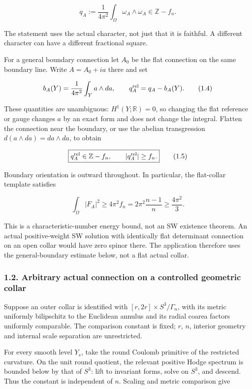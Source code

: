 \documentclass[
  10pt,
]{article}
\begin{document}
\[
 q_A:=\frac1{4\pi^2}\int_\Omega\omega_A\wedge\omega_A
                  \in\mathbb Z-f_n.
 \tag{1.3}
\]

The statement uses the actual character, not just that it is faithful. A
different character can have a different fractional square.

For a general boundary connection let \(A_0\) be the flat connection on
the same boundary line. Write \(A=A_0+ia\) there and set

\[
 b_A(Y)=\frac1{4\pi^2}\int_Y a\wedge da,
 \qquad q_A^{\rm rel}=q_A-b_A(Y).
 \tag{1.4}
\]

These quantities are unambiguous: \(H^1(Y;\mathbb R)=0\), so changing
the flat reference or gauge changes \(a\) by an exact form and does not
change the integral. Flatten the connection near the boundary, or use
the abelian transgression \(d(a\wedge da)=da\wedge da\), to obtain

\[
 \boxed{q_A^{\rm rel}\in\mathbb Z-f_n,\qquad
 |q_A^{\rm rel}|\ge f_n.}
 \tag{1.5}
\]

Boundary orientation is outward throughout. In particular, the
flat-collar template satisfies

\[
 \boxed{\int_\Omega|F_A|^2\ge4\pi^2 f_n
             =2\pi^2\frac{n-1}{n}\ge\frac{4\pi^2}{3}.}
 \tag{1.6}
\]

This is a characteristic-number energy bound, not an SW existence
theorem. An actual positive-weight SW solution with identically flat
determinant connection on an open collar would have zero spinor there.
The application therefore uses the general-boundary estimate below, not
a flat actual collar.

\hypertarget{arbitrary-actual-connection-on-a-controlled-geometric-collar}{%
\subsubsection{1.2. Arbitrary actual connection on a controlled
geometric
collar}\label{arbitrary-actual-connection-on-a-controlled-geometric-collar}}

Suppose an outer collar is identified with
\([r,2r]\times S^3/\Gamma_n\), with its metric uniformly bilipschitz to
the Euclidean annulus and its radial coarea factors uniformly
comparable. The comparison constant is fixed; \(r\), \(n\), interior
geometry and internal scale separation are unrestricted.

For every smooth level \(Y_s\), take the round Coulomb primitive of the
restricted curvature. On the unit round quotient, the relevant positive
Hodge spectrum is bounded below by that of \(S^3\): lift to invariant
forms, solve on \(S^3\), and descend. Thus the constant is independent
of \(n\). Scaling and metric comparison give
\end{document}
